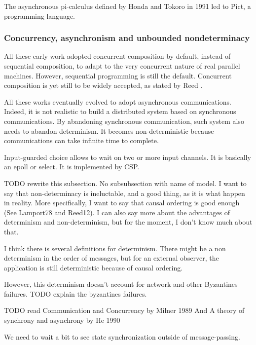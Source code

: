 The asynchronous pi-calculus defined by Honda and Tokoro in 1991 led to Pict, a programming language\cite{Pierce2000}.

\subsubsection{Concurrency, asynchronism and unbounded nondeterminacy}

All these early work adopted concurrent composition by default, instead of sequential composition, to adapt to the very concurrent nature of real parallel machines.
However, sequential programming is still the default.
Concurrent composition is yet still to be widely accepted, as stated by Reed \cite{Reed2012}.

All these works eventually evolved to adopt asynchronous communications.
Indeed, it is not realistic to build a distributed system based on synchronous communications. 
By abandoning synchronous communication, such system also needs to abandon determinism.
It becomes non-deterministic because communications can take infinite time to complete.


Input-guarded choice allows to wait on two or more input channels.
It is basically an epoll or select.
It is implemented by CSP.





TODO rewrite this subsection.
No subsubsection with name of model.
I want to say that non-determinacy is ineluctable, and a good thing, as it is what happen in reality.
More specifically, I want to say that causal ordering is good enough (See Lamport78 and Reed12).
I can also say more about the advantages of determinism and non-determinism, but for the moment, I don't know much about that.

I think there is several definitions for determinism.
There might be a non determinism in the order of messages, but for an external observer, the application is still deterministic because of causal ordering.

However, this determinism doesn't account for network and other Byzantines failures.
TODO explain the byzantines failures.


TODO read Communication and Concurrency by Milner 1989
And A theory of synchrony and asynchrony by He 1990


We need to wait a bit to see state synchronization outside of message-passing. 


